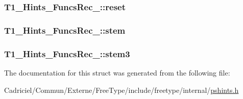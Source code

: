 \hypertarget{struct_t1___hints___funcs_rec___a5646878cdabd593389e28cffd8b077cb}{
\subsubsection[{reset}]{ T1\-\_\-\-Hints\-\_\-\-Funcs\-Rec\-\_\-\-::reset}}\label{struct_t1___hints___funcs_rec___a5646878cdabd593389e28cffd8b077cb}
\hypertarget{struct_t1___hints___funcs_rec___abdbf955a1fc9b19799ed8ea8137c9381}{
\subsubsection[{stem}]{ T1\-\_\-\-Hints\-\_\-\-Funcs\-Rec\-\_\-\-::stem}}\label{struct_t1___hints___funcs_rec___abdbf955a1fc9b19799ed8ea8137c9381}
\hypertarget{struct_t1___hints___funcs_rec___acc1edae831d279929f93c8eb1872daa3}{
\subsubsection[{stem3}]{ T1\-\_\-\-Hints\-\_\-\-Funcs\-Rec\-\_\-\-::stem3}}\label{struct_t1___hints___funcs_rec___acc1edae831d279929f93c8eb1872daa3}


The documentation for this struct was generated from the following file\-:\begin{DoxyCompactItemize}
\item 
Cadriciel/\-Commun/\-Externe/\-Free\-Type/include/freetype/internal/\hyperlink{pshints_8h}{pshints.\-h}\end{DoxyCompactItemize}

